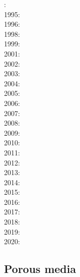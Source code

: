 {\scriptsize
{}: \cite{rich94}\cite{fari94}\\
1995: \cite{whmc95}\\
1996: \cite{zhgm96}\\
1998: \cite{bisp98}\cite{most98}\\
1999: \cite{most99}\cite{shet99}\\
2001: \cite{vapy01}\\
2002: \cite{foul02}\\
2003: \cite{vazh03}\\
2004: \cite{yoog04}\\
2005: \cite{bugu05}\cite{fasa05}\cite{yoog05}\\
2006: \cite{dabu06}\\
2007: \cite{stco07}\\
2008: \cite{uegs08}\cite{slee08}\\
2009: \cite{bucl09}\cite{zhgy09}\cite{baiv10}\cite{tabs09}\cite{maml09}\\
2010: \cite{fabl10}\\
2011: \cite{sosk11}\cite{vasd11}\\
2012: \cite{huco12}\cite{gubc12}\cite{egim17}\\
2013: \cite{bemm12}\cite{brps13}\\
2014: \cite{buge14}\cite{gery14b}\cite{buto14}\cite{buit14}\cite{leli14}\\
2015: \cite{bemm15}\cite{gesb15}\cite{kocb15}\cite{meds15}\cite{lile15}\cite{medd15}\cite{frro15}\\
2016: \cite{fige16}\cite{gadb16}\cite{kobc16}\\
2017: \cite{bahf17}\cite{brsg17}\cite{bahf17}\cite{bekb17}\cite{kocb17}\\
2018: \cite{daga18}\cite{frkc18}\cite{frbr18}\\
2019: \cite{kobg19}\cite{stbl19}\cite{botb19}\\
2020:\cite{basg20}
}

\subsection{Porous media} 

{\scriptsize
\noindent
\cite{scst86}
\cite{scot88}
\cite{spie93}
\cite{scth00b}
\cite{dyge13}
\cite{eitp19}
\cite{eitf20}
}

